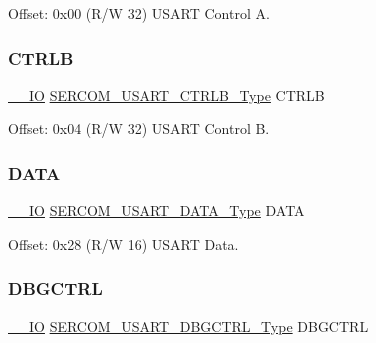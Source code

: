 Offset\+: 0x00 (R/W 32) U\+S\+A\+RT Control A. 

\mbox{\label{struct_sercom_usart_a0c38e46fd8984007c22cb77f98eb5398}} 
\subsubsection{\texorpdfstring{CTRLB}{CTRLB}}
{\footnotesize\ttfamily \mbox{\hyperlink{core__cm0plus_8h_aec43007d9998a0a0e01faede4133d6be}{\+\_\+\+\_\+\+IO}} \mbox{\hyperlink{union_s_e_r_c_o_m___u_s_a_r_t___c_t_r_l_b___type}{S\+E\+R\+C\+O\+M\+\_\+\+U\+S\+A\+R\+T\+\_\+\+C\+T\+R\+L\+B\+\_\+\+Type}} C\+T\+R\+LB}



Offset\+: 0x04 (R/W 32) U\+S\+A\+RT Control B. 

\mbox{\label{struct_sercom_usart_a9825560cef3f31ff34e49aa417eb1f64}} 
\subsubsection{\texorpdfstring{DATA}{DATA}}
{\footnotesize\ttfamily \mbox{\hyperlink{core__cm0plus_8h_aec43007d9998a0a0e01faede4133d6be}{\+\_\+\+\_\+\+IO}} \mbox{\hyperlink{union_s_e_r_c_o_m___u_s_a_r_t___d_a_t_a___type}{S\+E\+R\+C\+O\+M\+\_\+\+U\+S\+A\+R\+T\+\_\+\+D\+A\+T\+A\+\_\+\+Type}} D\+A\+TA}



Offset\+: 0x28 (R/W 16) U\+S\+A\+RT Data. 

\mbox{\label{struct_sercom_usart_a60189a8ca1ac6368c42c4e668963fcb0}} 
\subsubsection{\texorpdfstring{DBGCTRL}{DBGCTRL}}
{\footnotesize\ttfamily \mbox{\hyperlink{core__cm0plus_8h_aec43007d9998a0a0e01faede4133d6be}{\+\_\+\+\_\+\+IO}} \mbox{\hyperlink{union_s_e_r_c_o_m___u_s_a_r_t___d_b_g_c_t_r_l___type}{S\+E\+R\+C\+O\+M\+\_\+\+U\+S\+A\+R\+T\+\_\+\+D\+B\+G\+C\+T\+R\+L\+\_\+\+Type}} D\+B\+G\+C\+T\+RL}



